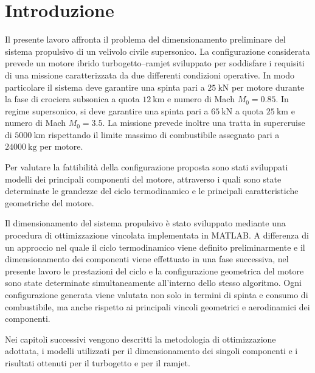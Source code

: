 \chapter*{Introduzione}

Il presente lavoro affronta il problema del dimensionamento preliminare del sistema propulsivo di un velivolo civile supersonico. La configurazione considerata prevede un motore ibrido turbogetto--ramjet sviluppato per soddisfare i requisiti di una missione caratterizzata da due differenti condizioni operative. In modo particolare il sistema deve garantire una spinta pari a $25\ \mathrm{kN}$ per motore durante la fase di crociera subsonica a quota $12\ \mathrm{km}$ e numero di Mach $M_0=0.85$. In regime supersonico, si deve garantire una spinta pari a $65\ \mathrm{kN}$ a quota $25\ \mathrm{km}$ e numero di Mach $M_0=3.5$. La missione prevede inoltre una tratta in supercruise di $5000\ \mathrm{km}$ rispettando il limite massimo di combustibile assegnato pari a $24000\ \mathrm{kg}$ per motore.

Per valutare la fattibilità della configurazione proposta sono stati sviluppati modelli dei principali componenti del motore, attraverso i quali sono state determinate le grandezze del ciclo termodinamico e le principali caratteristiche geometriche del motore. 

Il dimensionamento del sistema propulsivo è stato sviluppato mediante una procedura di ottimizzazione vincolata implementata in  MATLAB. A differenza di un approccio  nel quale il ciclo termodinamico viene definito preliminarmente e il dimensionamento dei componenti viene effettuato in una fase successiva, nel presente lavoro le prestazioni del ciclo e la configurazione geometrica del motore sono state determinate simultaneamente all'interno dello stesso algoritmo. Ogni configurazione generata  viene valutata non solo in termini di spinta e consumo di combustibile, ma anche rispetto ai principali vincoli geometrici e aerodinamici dei componenti.


Nei capitoli successivi vengono descritti la metodologia di ottimizzazione adottata, i modelli utilizzati per il dimensionamento dei singoli componenti e i risultati ottenuti per il turbogetto e per il ramjet.